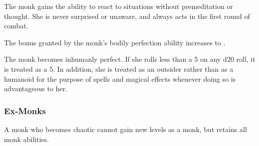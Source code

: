  The monk gains the ability to react to situations without premeditation or thought. She is never surprised or unaware, and always acts in the first round of combat.

 The bonus granted by the monk's bodily perfection ability increases to .

 The monk becomes inhumanly perfect. If she rolls less than a 5 on any d20 roll, it is treated as a 5. In addition, she is treated as an outsider rather than as a humanoid for the purpose of spells and magical effects whenever doing so is advantageous to her.

\subsubsection{Ex-Monks}
A monk who becomes chaotic cannot gain new levels as a monk, but retains all monk abilities.

